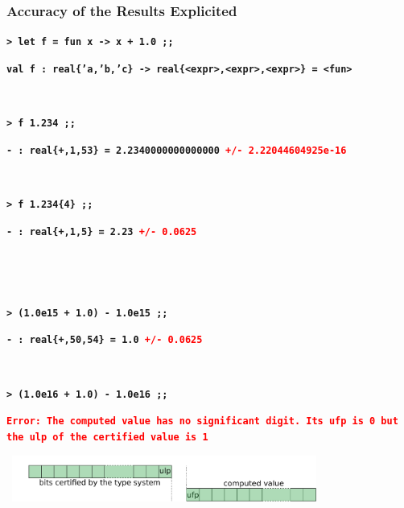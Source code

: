 \documentclass[handout,t]{beamer}
\def\mytt#1{\texttt{\textbf{#1}}}
\def\real#1{real\{#1\}}
\begin{document}
\begin{frame}
\frametitle{Accuracy of the Results Explicited}

\scriptsize
\color{blue}

\vspace{0.1cm}

\mytt{> let f = fun x -> x + 1.0 ;;}

\mytt{val f : \real{'a,'b,'c} -> \real{<expr>,<expr>,<expr>} = <fun>}

\mytt{\ }


\mytt{> f 1.234 ;;}

\mytt{- : \real{+,1,53} = 2.2340000000000000 \textcolor{red}{+/- 2.22044604925e-16}}

\mytt{\ }

\mytt{> f 1.234\{4\} ;;}

\mytt{- : \real{+,1,5} = 2.23 \textcolor{red}{+/- 0.0625}}

\mytt{\ }

\mytt{\ }


\mytt{> (1.0e15 + 1.0) - 1.0e15 ;;}

\mytt{- : \real{+,50,54} = 1.0 \textcolor{red}{+/- 0.0625}}

\mytt{\ }

\mytt{> (1.0e16 + 1.0) - 1.0e16 ;;}

\mytt{\textcolor{red}{Error: The computed value has no significant digit. Its ufp is 0 but the ulp of the certified
value is 1}}

\vspace{0.3cm}

~\hfill\includegraphics[width=10cm]{cancel.pdf}

\end{frame}
\end{document}
